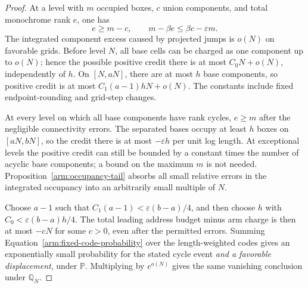 \begin{proof}
At a level with $m$ occupied boxes, $c$ union components, and total
monochrome rank $e$, one has
\[
 e\ge m-c,\qquad m-\beta e\le\beta c-\varepsilon m.
\]
The integrated component excess caused by projected jumps is $o(N)$
on favorable grids.  Before level $N$, all base cells can be charged
as one component up to $o(N)$; hence the possible positive credit
there is at most $C_0N+o(N)$, independently of $h$.  On $[N,aN]$,
there are at most $h$ base components, so positive credit is at most
$C_1(a-1)hN+o(N)$.  The constants include fixed endpoint-rounding
and grid-step changes.

At every level on which all base components have rank cycles,
$e\ge m$ after the negligible connectivity errors.  The separated
bases occupy at least $h$ boxes on $[aN,bN]$, so the credit there is
at most $-\varepsilon h$ per unit log length.  At exceptional levels
the positive credit can still be bounded by a constant times the
number of acyclic base components; a bound on the maximum $m$ is
not needed.  Proposition~\ref{arm:occupancy-tail} absorbs all small
relative errors in the integrated occupancy into an arbitrarily
small multiple of $N$.

Choose $a-1$ such that
$C_1(a-1)<\varepsilon(b-a)/4$, and then choose $h$ with
$C_0<\varepsilon(b-a)h/4$.  The total leading address budget minus
arm charge is then at most $-cN$ for some $c>0$, even after the
permitted errors.  Summing Equation~\eqref{arm:fixed-code-probability}
over the length-weighted codes gives an exponentially small
probability for the stated cycle event \emph{and a favorable
displacement}, under $\mathbb P$.  Multiplying by $e^{o(N)}$ gives
the same vanishing conclusion under $\mathbb Q_N$.


\end{proof}
